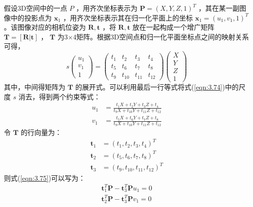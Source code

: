 假设3D空间中的一点 $P$ ，用齐次坐标表示为 $\boldsymbol{P}=(X, Y, Z, 1)^{T} $ ，其在某一副图像中的投影点为 $\boldsymbol{x}_{1}$ ，用齐次坐标表示其在归一化平面上的坐标 $\boldsymbol{x}_{1}=\left(u_{1}, v_{1}, 1\right)^{T} $ 。该图像对应的相机位姿为 $\boldsymbol{R}, \boldsymbol{t} $ ，将 $\boldsymbol{R}, \boldsymbol{t} $ 放在一起构成一个增广矩阵 $\boldsymbol{T}= [ \boldsymbol{R} | \boldsymbol{t}] $ ， $ \boldsymbol{T} $ 为3×4矩阵。根据3D空间点和归一化平面坐标点之间的映射关系可得，
\begin{equation}
\label{eqn:3.74}
s \left( \begin{array}{c}{u_{1}} \\ {v_{1}} \\ {1}\end{array}\right)=\left( \begin{array}{cccc}{t_{1}} & {t_{2}} & {t_{3}} & {t_{4}} \\ {t_{5}} & {t_{6}} & {t_{7}} & {t_{8}} \\ {t_{9}} & {t_{10}} & {t_{11}} & {t_{12}}\end{array}\right) \left( \begin{array}{c}{X} \\ {Y} \\ {Z} \\ {1}\end{array}\right)
\end{equation}
其中，中间得矩阵为 $ \boldsymbol{T} $ 的展开式。可以利用最后一行等式将式(\ref{eqn:3.74})中的尺度 $s$ 消去，得到两个约束等式：
\begin{equation}
\label{eqn:3.75}
\begin{aligned}
u_{1} &= \frac{t_{1} X+t_{2} Y+t_{3} Z+t_{4}}{t_{9} X+t_{10} Y+t_{11} Z+t_{12}} \\
v_{1} &= \frac{t_{5} X+t_{6} Y+t_{7} Z+t_{8}}{t_{9} X+t_{10} Y+t_{11} Z+t_{12}}
\end{aligned}
\end{equation}
令 $ \boldsymbol{T} $ 的行向量为：
\begin{equation}
\label{eqn:3.76}
\begin{aligned}
\boldsymbol{t} _{1} &= \left(t_{1}, t_{2}, t_{3}, t_{4}\right)^{T} \\
\boldsymbol{t} _{2} &= \left(t_{5}, t_{6}, t_{7}, t_{8}\right)^{T} \\
\boldsymbol{t} _{3} &= \left(t_{9}, t_{10}, t_{11}, t_{12}\right)^{T}
\end{aligned}
\end{equation}
则式(\ref{eqn:3.75})可以写为：
\begin{equation}
\label{eqn:3.77}
\begin{aligned}
\boldsymbol{t}_{1}^{T} \boldsymbol{P}-\boldsymbol{t}_{3}^{T} \boldsymbol{P} u_{1}=0 \\
\boldsymbol{t}_{2}^{T} \boldsymbol{P}-\boldsymbol{t}_{3}^{T} \boldsymbol{P} v_{1}=0
\end{aligned}
\end{equation}

